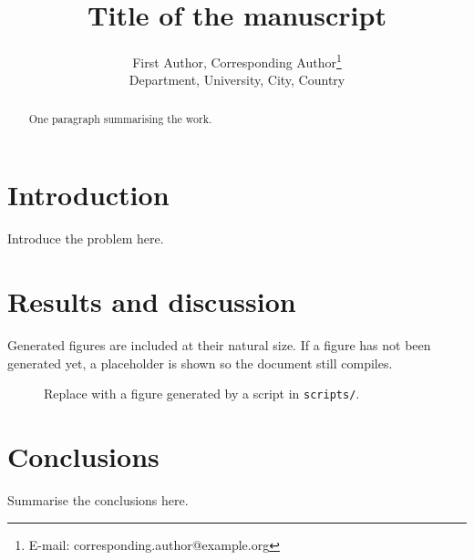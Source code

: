 \documentclass[twocolumn, 10pt]{article}
\title{Title of the manuscript}
\author{First Author, Corresponding Author\thanks{E-mail: corresponding.author@example.org}\\
  \small Department, University, City, Country}
\date{}
\begin{document}
\maketitle

\begin{abstract}
  One paragraph summarising the work.
\end{abstract}

\section{Introduction}

Introduce the problem here.

\section{Results and discussion}

Generated figures are included at their natural size. If a figure has not been generated
yet, a placeholder is shown so the document still compiles.

\begin{figure}[htbp]
  \centering
  \caption{Replace with a figure generated by a script in \texttt{scripts/}.}
  \label{fig:example}
\end{figure}

\section{Conclusions}

Summarise the conclusions here.



\end{document}
